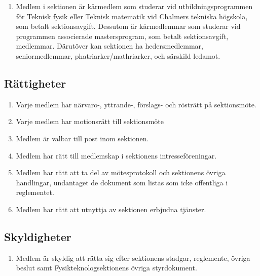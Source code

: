 \documentclass[11pt,a4paper]{article}
\begin{document}
\begin{enumerate}[\thesubsection .1]
   
   \item Medlem i sektionen är kårmedlem som studerar vid utbildningsprogrammen för Teknisk fysik eller Teknisk matematik vid Chalmers tekniska högskola, som betalt sektionsavgift. Dessutom är kårmedlemmar som studerar vid programmen associerade mastersprogram, som betalt sektionsavgift, medlemmar. Därutöver kan sektionen ha hedersmedlemmar, seniormedlemmar, phatriarker/mathriarker, och särskild ledamot.
   
\end{enumerate}

\subsection{Rättigheter}

\begin{enumerate}[\thesubsection .1]

   \item Varje medlem har närvaro-, yttrande-, förslags- och rösträtt
   på sektionsmöte.
   
   \item Varje medlem har motionsrätt till sektionsmöte

   \item Medlem är valbar till post inom sektionen.

   \item Medlem har rätt till medlemskap i sektionens intresseföreningar.

   \item Medlem har rätt att ta del av mötesprotokoll och sektionens
   övriga handlingar, undantaget de dokument som listas som icke offentliga i reglementet. 
   \item Medlem har rätt att utnyttja av sektionen erbjudna tjänster.

\end{enumerate}

\subsection{Skyldigheter}

\begin{enumerate}[\thesubsection .1]

   \item Medlem är skyldig att rätta sig efter sektionens stadgar,
   regle\-mente,
   övriga beslut samt  Fysikteknologsektionens övriga styrdokument.

\end{enumerate}
\end{document}
